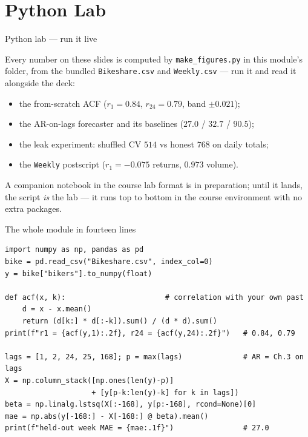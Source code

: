 \documentclass[aspectratio=169,11pt]{beamer}
\begin{document}
\section{Python Lab}

\begin{frame}{Python lab --- run it live}
  \begin{labnote}
    Every number on these slides is computed by \texttt{make\_figures.py} in this
    module's folder, from the bundled \texttt{Bikeshare.csv} and
    \texttt{Weekly.csv} --- run it and read it alongside the deck:
    \begin{itemize}
      \item the from-scratch ACF ($r_1 = 0.84$, $r_{24} = 0.79$, band $\pm 0.021$);
      \item the AR-on-lags forecaster and its baselines ($27.0$ / $32.7$ / $90.5$);
      \item the leak experiment: shuffled CV $514$ vs honest $768$ on daily totals;
      \item the \texttt{Weekly} postscript ($r_1 = -0.075$ returns, $0.973$ volume).
    \end{itemize}
    A companion notebook in the course lab format is in preparation; until it
    lands, the script \emph{is} the lab --- it runs top to bottom in the course
    environment with no extra packages.
  \end{labnote}
\end{frame}

\begin{frame}[fragile]{The whole module in fourteen lines}
\begin{lstlisting}
import numpy as np, pandas as pd
bike = pd.read_csv("Bikeshare.csv", index_col=0)
y = bike["bikers"].to_numpy(float)

def acf(x, k):                       # correlation with your own past
    d = x - x.mean()
    return (d[k:] * d[:-k]).sum() / (d * d).sum()
print(f"r1 = {acf(y,1):.2f}, r24 = {acf(y,24):.2f}")   # 0.84, 0.79

lags = [1, 2, 24, 25, 168]; p = max(lags)              # AR = Ch.3 on lags
X = np.column_stack([np.ones(len(y)-p)]
                    + [y[p-k:len(y)-k] for k in lags])
beta = np.linalg.lstsq(X[:-168], y[p:-168], rcond=None)[0]
mae = np.abs(y[-168:] - X[-168:] @ beta).mean()
print(f"held-out week MAE = {mae:.1f}")                # 27.0
\end{lstlisting}
\end{frame}
\end{document}
